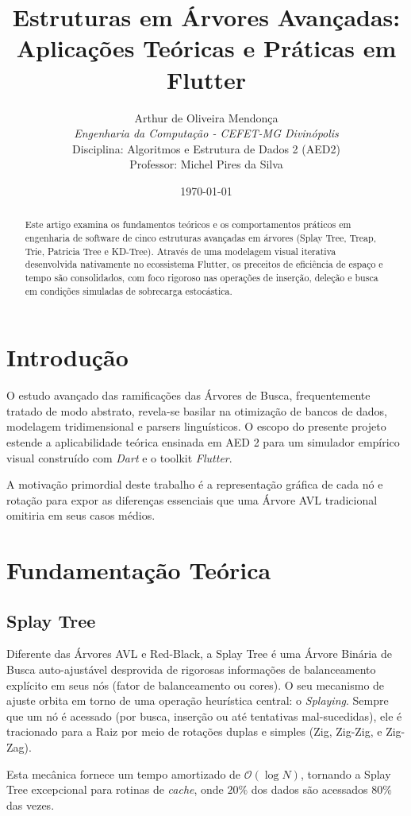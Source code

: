 \documentclass[12pt,a4paper]{article}
\title{\textbf{Estruturas em Árvores Avançadas: Aplicações Teóricas e Práticas em Flutter}}
\author{
    Arthur de Oliveira Mendonça \\
    \textit{Engenharia da Computação - CEFET-MG Divinópolis} \\
    Disciplina: Algoritmos e Estrutura de Dados 2 (AED2) \\
    Professor: Michel Pires da Silva
}
\date{\today}
\begin{document}
\maketitle

\begin{abstract}
Este artigo examina os fundamentos teóricos e os comportamentos práticos em engenharia de software de cinco estruturas avançadas em árvores (Splay Tree, Treap, Trie, Patricia Tree e KD-Tree). Através de uma modelagem visual iterativa desenvolvida nativamente no ecossistema Flutter, os preceitos de eficiência de espaço e tempo são consolidados, com foco rigoroso nas operações de inserção, deleção e busca em condições simuladas de sobrecarga estocástica.
\end{abstract}

\section{Introdução}
O estudo avançado das ramificações das Árvores de Busca, frequentemente tratado de modo abstrato, revela-se basilar na otimização de bancos de dados, modelagem tridimensional e parsers linguísticos. O escopo do presente projeto estende a aplicabilidade teórica ensinada em AED 2 para um simulador empírico visual construído com \textit{Dart} e o toolkit \textit{Flutter}. 

A motivação primordial deste trabalho é a representação gráfica de cada nó e rotação para expor as diferenças essenciais que uma Árvore AVL tradicional omitiria em seus casos médios.  

\section{Fundamentação Teórica}

\subsection{Splay Tree}
Diferente das Árvores AVL e Red-Black, a Splay Tree é uma Árvore Binária de Busca auto-ajustável desprovida de rigorosas informações de balanceamento explícito em seus nós (fator de balanceamento ou cores). O seu mecanismo de ajuste orbita em torno de uma operação heurística central: o \textit{Splaying}. Sempre que um nó é acessado (por busca, inserção ou até tentativas mal-sucedidas), ele é tracionado para a Raiz por meio de rotações duplas e simples (Zig, Zig-Zig, e Zig-Zag).

Esta mecânica fornece um tempo amortizado de $\mathcal{O}(\log N)$, tornando a Splay Tree excepcional para rotinas de \textit{cache}, onde $20\%$ dos dados são acessados $80\%$ das vezes.
\end{document}
